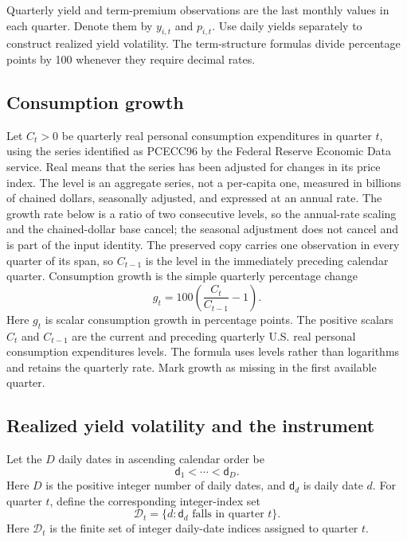 \documentclass[11pt]{article}
\begin{document}
Quarterly yield and term-premium observations are the last monthly values in each quarter. Denote
them by \(y_{i,t}\) and \(p_{i,t}\). Use daily yields separately to construct realized yield volatility.
The term-structure formulas divide percentage points by 100 whenever they require decimal rates.

\subsection{Consumption growth}

Let \(C_t>0\) be quarterly real personal consumption expenditures in quarter \(t\), using the
series identified as PCECC96 by the Federal Reserve Economic Data service. Real means that the
series has been adjusted for changes in its price index. The level is an aggregate series, not a per-capita one, measured in billions of chained dollars,
seasonally adjusted, and expressed at an annual rate.
The growth rate below is a ratio of two consecutive levels, so the annual-rate scaling and the
chained-dollar base cancel; the seasonal adjustment does not cancel and is part of the input
identity. The preserved copy carries one observation in every quarter of its span, so \(C_{t-1}\) is
the level in the immediately preceding calendar quarter. Consumption growth is the simple
quarterly percentage change
\begin{equation*}
 g_t=100\left(\frac{C_t}{C_{t-1}}-1\right).
\end{equation*}
Here \(g_t\) is scalar consumption growth in percentage points. The positive scalars \(C_t\) and
\(C_{t-1}\) are the current and preceding quarterly U.S. real personal consumption expenditures
levels. The formula uses levels rather than logarithms and retains the quarterly rate. Mark growth
as missing in the first available quarter.

\subsection{Realized yield volatility and the instrument}

Let the \(D\) daily dates in ascending calendar order be
\[
 \mathsf d_1<\cdots<\mathsf d_D.
\]
Here \(D\) is the positive integer number of daily dates, and \(\mathsf d_d\) is daily date \(d\).
For quarter \(t\), define the corresponding integer-index set
\[
 \mathcal D_t=\{d:\mathsf d_d\text{ falls in quarter }t\}.
\]
Here \(\mathcal D_t\) is the finite set of integer daily-date indices assigned to quarter \(t\).
\end{document}
